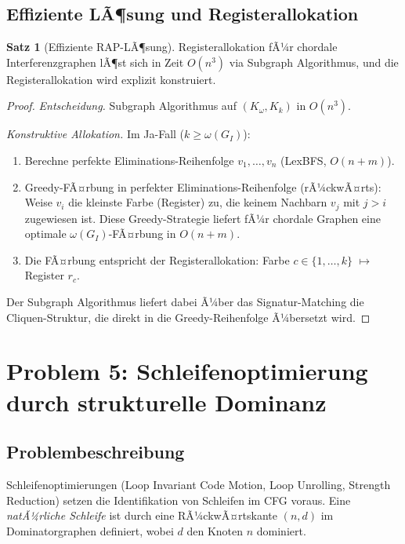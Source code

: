 ﻿\documentclass[a4paper,12pt]{article}
\theoremstyle{definition}
\newtheorem{satz}{Satz}
\begin{document}
\subsection{Effiziente LÃ¶sung und Registerallokation}

\begin{satz}[Effiziente RAP-LÃ¶sung]
Registerallokation fÃ¼r chordale Interferenzgraphen lÃ¶st sich in Zeit $O(n^3)$ via Subgraph Algorithmus, und die Registerallokation wird explizit konstruiert.
\end{satz}

\begin{proof}
\textit{Entscheidung.} Subgraph Algorithmus auf $(K_{\omega}, K_k)$ in $O(n^3)$.

\textit{Konstruktive Allokation.} Im Ja-Fall ($k \geq \omega(G_I)$):
\begin{enumerate}
    \item Berechne perfekte Eliminations-Reihenfolge $v_1, \ldots, v_n$ (LexBFS, $O(n + m)$).
    \item Greedy-FÃ¤rbung in perfekter Eliminations-Reihenfolge (rÃ¼ckwÃ¤rts): Weise $v_i$ die kleinste Farbe (Register) zu, die keinem Nachbarn $v_j$ mit $j > i$ zugewiesen ist. Diese Greedy-Strategie liefert fÃ¼r chordale Graphen eine optimale $\omega(G_I)$-FÃ¤rbung in $O(n + m)$.
    \item Die FÃ¤rbung entspricht der Registerallokation: Farbe $c \in \{1, \ldots, k\}$ $\mapsto$ Register $r_c$.
\end{enumerate}

Der Subgraph Algorithmus liefert dabei Ã¼ber das Signatur-Matching die Cliquen-Struktur, die direkt in die Greedy-Reihenfolge Ã¼bersetzt wird.
\end{proof}

\section{Problem 5: Schleifenoptimierung durch strukturelle Dominanz}
\label{sec:loop}

\subsection{Problembeschreibung}

Schleifenoptimierungen (Loop Invariant Code Motion, Loop Unrolling, Strength Reduction) setzen die Identifikation von Schleifen im CFG voraus. Eine \emph{natÃ¼rliche Schleife} ist durch eine RÃ¼ckwÃ¤rtskante $(n, d)$ im Dominatorgraphen definiert, wobei $d$ den Knoten $n$ dominiert.
\end{document}
